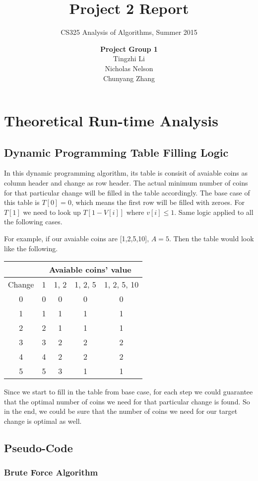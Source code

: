 \documentclass[11pt]{scrreprt}
\title{\textbf{Project 2 Report}}
\subtitle{CS325 Analysis of Algorithms, Summer 2015}
\author{\textsf{\textbf{Project Group 1}}\\
		\textsf{Tingzhi Li}\\
		\textsf{Nicholas Nelson}\\
		\textsf{Chunyang Zhang}}
\date{}
\begin{document}
\maketitle

\chapter{Theoretical Run-time Analysis}

\section{Dynamic Programming Table Filling Logic}

In this dynamic programming algorithm, its table is consisit of avaiable coins as column header and change as row header. The actual minimum number of coins for that particular change will be filled in the table accordingly. The base case of this table is $T[0]=0$, which means the first row will be filled with zeroes. For $T[1]$ we need to look up $T[1-V[i]]$ where $v[i]\leq 1$. Same logic applied to all the following cases.

For example, if our avaiable coins are [1,2,5,10], $A=5$. Then the table would look like the following.

\begin{tabular}{|c|c|c|c|c|}
	\hline & \multicolumn{4}{|c|}{Avaiable coins' value} \\
	\hline Change & 1  & 1, 2 & 1, 2, 5 & 1, 2, 5, 10 \\ 
	\hline 0 & 0 & 0 & 0 & 0 \\ 
	\hline 1 & 1 & 1 & 1 & 1 \\ 
	\hline 2 & 2 & 1 & 1 & 1 \\ 
	\hline 3 & 3 & 2 & 2 & 2 \\ 
	\hline 4 & 4 & 2 & 2 & 2 \\ 
	\hline 5 & 5 & 3 & 1 & 1 \\ 
	\hline 
\end{tabular} 

Since we start to fill in the table from base case, for each step we could guarantee that the optimal number of coins we need for that particular change is found. So in the end, we could be sure that the number of coins we need for our target change is optimal as well.

\section{Pseudo-Code}
\subsection {Brute Force Algorithm}
\end{document}
